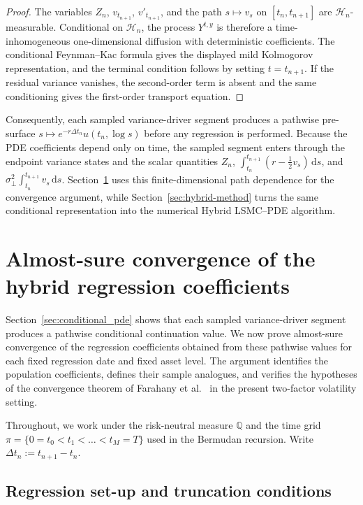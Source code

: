 \documentclass[pdflatex,sn-mathphys-num]{sn-jnl}
\theoremstyle{thmstyleone}%
\theoremstyle{thmstylethree}%
\theoremstyle{thmstyletwo}%
\newcommand{\dd}{\mathrm d}
\begin{document}
\begin{proof}
The variables $Z_n$, $v_{t_{n+1}}$, $v'_{t_{n+1}}$, and the path $s\mapsto v_s$ on $[t_n,t_{n+1}]$ are
$\mathcal H_n$-measurable. Conditional on $\mathcal H_n$, the process $Y^{t,y}$ is therefore a
time-inhomogeneous one-dimensional diffusion with deterministic coefficients. The conditional Feynman--Kac
formula \cite[Ch.~5]{karatzas1991brownian} gives the displayed mild Kolmogorov representation, and the terminal
condition follows by setting $t=t_{n+1}$. If the residual variance vanishes, the second-order term is absent and
the same conditioning gives the first-order transport equation.
\end{proof}

Consequently, each sampled variance-driver segment produces a pathwise pre-surface
$s\mapsto e^{-r\Delta t_n}u(t_n,\log s)$ before any regression is performed. Because the PDE coefficients
depend only on time, the sampled segment enters through the endpoint variance states and the scalar quantities
$Z_n$, $\int_{t_n}^{t_{n+1}}(r-\frac12v_s)\,\dd s$, and
$\sigma_\perp^2\int_{t_n}^{t_{n+1}}v_s\,\dd s$. Section~\ref{sec:as_convergence} uses this finite-dimensional
path dependence for the convergence argument, while Section~\ref{sec:hybrid-method} turns the same conditional
representation into the numerical Hybrid LSMC--PDE algorithm.


\section{Almost-sure convergence of the hybrid regression coefficients}
\label{sec:as_convergence}

Section~\ref{sec:conditional_pde} shows that each sampled variance-driver segment produces a pathwise
conditional continuation value. We now prove almost-sure convergence of the regression coefficients obtained
from these pathwise values for each fixed regression date and fixed asset level. The argument identifies the
population coefficients, defines their sample analogues, and verifies the hypotheses of the convergence theorem
of Farahany et al.~\cite{farahany2020mixing} in the present two-factor volatility setting.

Throughout, we work under the risk-neutral measure $\mathbb{Q}$ and the time grid
$\pi=\{0=t_0<t_1<\dots<t_M=T\}$ used in the Bermudan recursion. Write
$\Delta t_n:=t_{n+1}-t_n$.

\subsection{Regression set-up and truncation conditions}
\label{subsec:regression_truncation}
\end{document}

